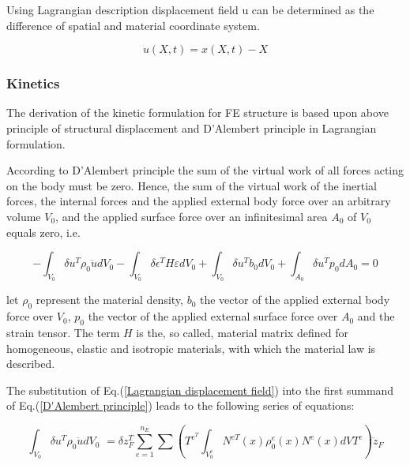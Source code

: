 Using Lagrangian description displacement field u can be determined
as the difference of spatial and material coordinate system.

\begin{equation}
u(X,t)=x(X,t)-X\label{Lagrangian displacement field}
\end{equation}







\subsubsection{Kinetics \citep{FEM}}

The derivation of the kinetic formulation for FE structure is based
upon above principle of structural displacement and D\textquoteright Alembert
principle in Lagrangian formulation.

According to D\textquoteright Alembert principle the sum of the virtual
work of all forces acting on the body must be zero. Hence, the sum
of the virtual work of the inertial forces, the internal forces and
the applied external body force over an arbitrary volume $V_{0}$,
and the applied surface force over an infinitesimal area $A_{0}$
of $V_{0}$ equals zero, i.e.


\begin{equation}
-\int_{V_{0}} \delta u^{T}\rho_{0}\textbf{$\ddot{u}$}dV_{0}-\int_{V_{0}}\delta\epsilon^{T}H\varepsilon dV_{0}+\int_{V_{0}}\delta u^{T} b_{0}dV_{0}+\int_{A_{0}}\delta u^{T}p_{0}dA_{0}=0\label{D'Alembert principle}
\end{equation}


let $\rho_{0}$ represent the material density, $b_{0}$ the vector
of the applied external body force over $V_{0}$, $p_{0}$ the vector
of the applied external surface force over $A_{0}$ and the strain
tensor. The term $H$ is the, so called, material matrix defined for
homogeneous, elastic and isotropic materials, with which the material
law is described.

The substitution of Eq.(\ref{Lagrangian displacement field}) into
the first summand of Eq.(\ref{D'Alembert principle}) leads to the
following series of equations: 

\begin{equation}
\int_{V_{0}}\delta u^{T}\rho_{0}\textbf{$\ddot{u}$}dV_{0}\,\,=\delta z_{F}^{T}\sum_{e=1}^{n_{E}}{\sum}\left(T^{e^{T}}\int_{V_{0}^{e}}N^{eT}(x)\rho_{0}^{e}(x)N^{e}(x)dVT^{e}\right)\ddot{z}_{F}
\end{equation}

